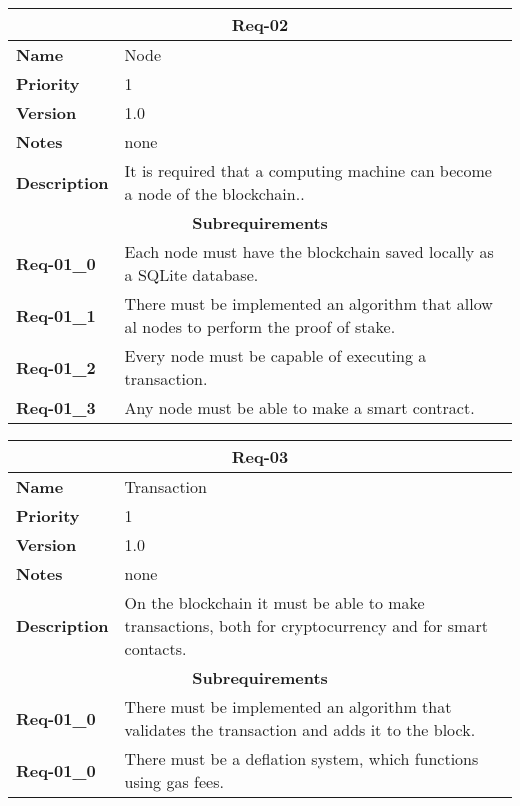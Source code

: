 \documentclass[../documentation.tex]{subfiles}
\begin{document}
\bgroup{}
\def\arraystretch{1.25}
\begin{center}
    \begin{tabular}{ |l|p{9cm}| }
        \hline
        \multicolumn{2}{|c|}{\textbf{Req-02}} \\
        \hline
        \textbf{Name} & Node \\
        \hline
        \textbf{Priority} & 1 \\
        \hline
        \textbf{Version} & 1.0 \\
        \hline
        \textbf{Notes} & none \\
        \hline
        \textbf{Description} & It is required that a computing machine can become a node of the blockchain.. \\
        \hline
        \multicolumn{2}{|c|}{\textbf{Subrequirements}} \\
        \hline
        \textbf{Req-01\_0} & Each node must have the blockchain saved locally as a SQLite database. \\
        \hline
        \textbf{Req-01\_1} & There must be implemented an algorithm that allow al nodes to perform the proof of stake. \\
        \hline
        \textbf{Req-01\_2} & Every node must be capable of executing a transaction. \\
        \hline
        \textbf{Req-01\_3} & Any node must be able to make a smart contract. \\
        \hline
    \end{tabular}
\end{center}
\egroup{}

\bgroup{}
\def\arraystretch{1.25}
\begin{center}
    \begin{tabular}{ |l|p{9cm}| }
        \hline
        \multicolumn{2}{|c|}{\textbf{Req-03}} \\
        \hline
        \textbf{Name} & Transaction \\
        \hline
        \textbf{Priority} & 1 \\
        \hline
        \textbf{Version} & 1.0 \\
        \hline
        \textbf{Notes} & none \\
        \hline
        \textbf{Description} & On the blockchain it must be able to make transactions, both for cryptocurrency and for smart contacts. \\
        \hline
        \multicolumn{2}{|c|}{\textbf{Subrequirements}} \\
        \hline
        \textbf{Req-01\_0} & There must be implemented an algorithm that validates the transaction and adds it to the block. \\
        \hline
        \textbf{Req-01\_0} & There must be a deflation system, which functions using gas fees. \\
        \hline
    \end{tabular}
\end{center}
\egroup{}
\end{document}
